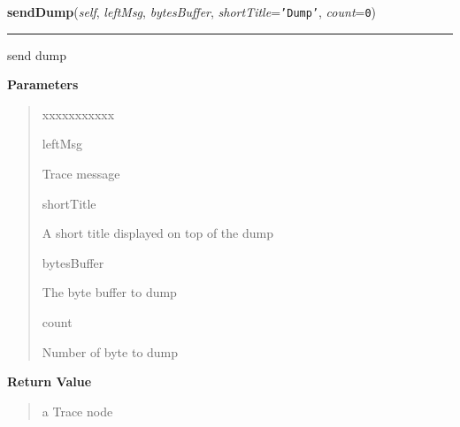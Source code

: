 \hspace{.8\funcindent}\begin{boxedminipage}{\funcwidth}

    \raggedright \textbf{sendDump}(\textit{self}, \textit{leftMsg}, \textit{bytesBuffer}, \textit{shortTitle}={\tt \texttt{'}\texttt{Dump}\texttt{'}}, \textit{count}={\tt 0})

    \vspace{-1.5ex}

    \rule{\textwidth}{0.5\fboxrule}
\setlength{\parskip}{2ex}
    send dump

\setlength{\parskip}{1ex}
      \textbf{Parameters}
      \vspace{-1ex}

      \begin{quote}
        \begin{Ventry}{xxxxxxxxxxx}

          \item[leftMsg]

          Trace message

          \item[shortTitle]

          A short title displayed on top of the dump

          \item[bytesBuffer]

          The byte buffer to dump

          \item[count]

          Number of byte to dump

        \end{Ventry}

      \end{quote}

      \textbf{Return Value}
    \vspace{-1ex}

      \begin{quote}
      a Trace node

      \end{quote}

    \end{boxedminipage}

    \label{tracetool:TraceToSend:sendBackgroundColor}

    \vspace{0.5ex}

